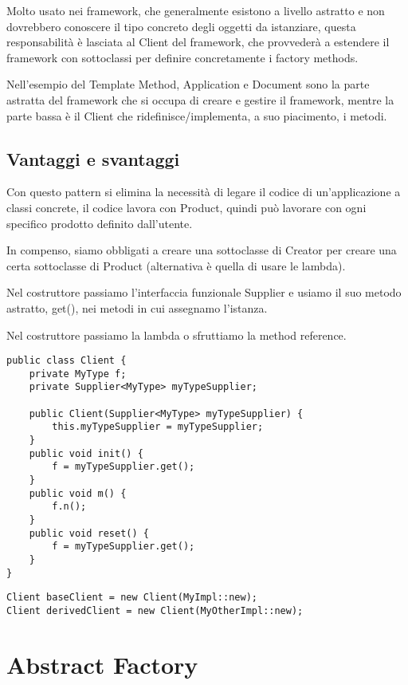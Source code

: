Molto usato nei framework, che generalmente esistono a livello astratto e non dovrebbero conoscere il tipo concreto degli oggetti da istanziare, questa responsabilità 
è lasciata al Client del framework, che provvederà a estendere il framework con sottoclassi per definire concretamente i factory methods.

Nell'esempio del Template Method, Application e Document sono la parte astratta del framework che si occupa di creare e gestire il framework, mentre la parte bassa 
è il Client che ridefinisce/implementa, a suo piacimento, i metodi.

\subsection{Vantaggi e svantaggi}

Con questo pattern si elimina la necessità di legare il codice di un’applicazione a classi concrete, il codice lavora con Product, quindi può lavorare con ogni specifico
prodotto definito dall’utente.
\smallskip

In compenso, siamo obbligati a creare una sottoclasse di Creator per creare una certa sottoclasse di Product (alternativa è quella di usare le lambda). 

Nel costruttore passiamo l'interfaccia funzionale Supplier e usiamo il suo metodo astratto, get(), nei metodi in cui assegnamo l'istanza.

Nel costruttore passiamo la lambda o sfruttiamo la method reference.

\begin{multicols}{2}
\begin{lstlisting}
public class Client {
    private MyType f;
    private Supplier<MyType> myTypeSupplier;
    
    public Client(Supplier<MyType> myTypeSupplier) {
        this.myTypeSupplier = myTypeSupplier;
    }
    public void init() {
        f = myTypeSupplier.get();
    }
    public void m() {
        f.n();
    }
    public void reset() {
        f = myTypeSupplier.get();
    }
}
\end{lstlisting}           
\columnbreak
\begin{lstlisting}
Client baseClient = new Client(MyImpl::new);
Client derivedClient = new Client(MyOtherImpl::new);
\end{lstlisting}
\end{multicols}

\section{Abstract Factory}

